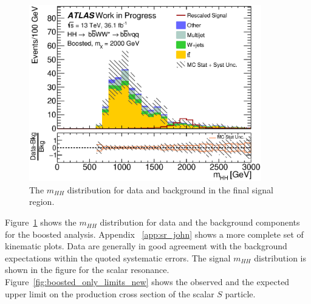 




\begin{figure}[h]
\begin{center}
\includegraphics[width=0.9\textwidth]{figures/kinplots/C_2tag_SR_lepton_presel_met50_hhMassRebin1}
\caption{The ${m_{HH}}$ distribution for data and background in the final signal region.}
\label{fig:fully_boost_mhh}
\end{center}
\end{figure}


Figure~\ref{fig:fully_boost_mhh} shows the $m_{HH}$ distribution for
data and the background components for the boosted analysis. Appendix ~\ref{app:sr_john} shows a more complete set of kinematic plots. 
Data are generally in good agreement with the background expectations within the quoted systematic errors.
The signal $m_{HH}$ distribution is shown in the figure for  the scalar resonance.
Figure~\ref{fig:boosted_only_limits_new} shows the observed and the expected
upper limit on the production cross section of the scalar $S$ particle.

